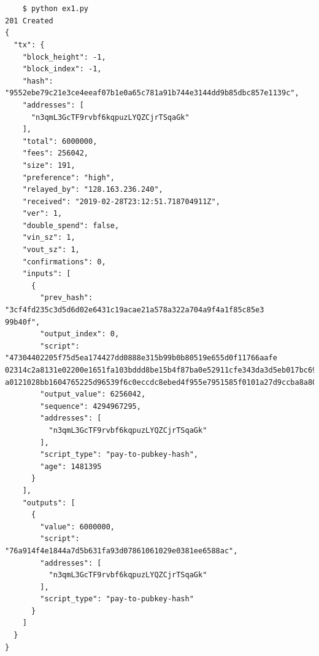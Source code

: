 \documentclass[letterpaper]{article}
\begin{document}
\section{}

\begin{verbatim}
    $ python ex1.py
201 Created
{
  "tx": {
    "block_height": -1,
    "block_index": -1,
    "hash": "9552ebe79c21e3ce4eeaf07b1e0a65c781a91b744e3144dd9b85dbc857e1139c",
    "addresses": [
      "n3qmL3GcTF9rvbf6kqpuzLYQZCjrTSqaGk"
    ],
    "total": 6000000,
    "fees": 256042,
    "size": 191,
    "preference": "high",
    "relayed_by": "128.163.236.240",
    "received": "2019-02-28T23:12:51.718704911Z",
    "ver": 1,
    "double_spend": false,
    "vin_sz": 1,
    "vout_sz": 1,
    "confirmations": 0,
    "inputs": [
      {
        "prev_hash": "3cf4fd235c3d5d6d02e6431c19acae21a578a322a704a9f4a1f85c85e3                             99b40f",
        "output_index": 0,
        "script": "47304402205f75d5ea174427dd0888e315b99b0b80519e655d0f11766aafe                             02314c2a8131e02200e1651fa103bddd8be15b4f87ba0e52911cfe343da3d5eb017bc698bd7e3c72                             a0121028bb1604765225d96539f6c0eccdc8ebed4f955e7951585f0101a27d9ccba8a80",
        "output_value": 6256042,
        "sequence": 4294967295,
        "addresses": [
          "n3qmL3GcTF9rvbf6kqpuzLYQZCjrTSqaGk"
        ],
        "script_type": "pay-to-pubkey-hash",
        "age": 1481395
      }
    ],
    "outputs": [
      {
        "value": 6000000,
        "script": "76a914f4e1844a7d5b631fa93d07861061029e0381ee6588ac",
        "addresses": [
          "n3qmL3GcTF9rvbf6kqpuzLYQZCjrTSqaGk"
        ],
        "script_type": "pay-to-pubkey-hash"
      }
    ]
  }
}

\end{verbatim}
\end{document}
